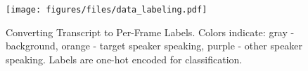 \begin{figure}[t]
\centering
\texttt{[image: figures/files/data\_labeling.pdf]}
\caption{
Converting Transcript to Per-Frame Labels. Colors indicate: gray - background, orange - target speaker speaking, purple - other speaker speaking. Labels are one-hot encoded for classification.
}
\vspace*{-1.5em}
\label{fig:data_annotation}
\end{figure}
